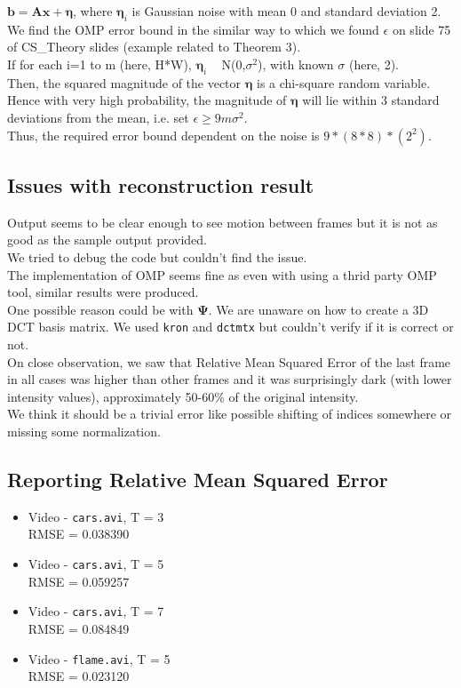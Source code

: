 \documentclass[fleqn, 11pt]{article}
\begin{document}
$\boldsymbol{b} = \boldsymbol{A} \boldsymbol{x} + \boldsymbol{\eta}$, where $\boldsymbol{\eta}_i$ is Gaussian noise with mean 0 and standard deviation 2. \\
We find the OMP error bound in the similar way to which we found $\epsilon$ on slide 75 of CS\_Theory slides (example related to Theorem 3). \\
If for each i=1 to m (here, H*W), $\boldsymbol{\eta}_i$ ~ N(0,$\sigma^2$), with known $\sigma$ (here, 2). \\
Then, the squared magnitude of the vector $\boldsymbol{\eta}$ is a chi-square random variable. \\
Hence with very high probability, the magnitude of $\boldsymbol{\eta}$ will lie within 3 standard deviations from the mean, i.e. set $\epsilon \ge 9m\sigma^2$. \\
Thus, the required error bound dependent on the noise is $9*(8*8)*(2^2)$.

\subsection*{Issues with reconstruction result}
Output seems to be clear enough to see motion between frames but it is not as good as the sample output provided. \\
We tried to debug the code but couldn't find the issue. \\
The implementation of OMP seems fine as even with using a thrid party OMP tool, similar results were produced. \\
One possible reason could be with $\boldsymbol{\Psi}$. We are unaware on how to create a 3D DCT basis matrix. We used \texttt{kron} and \texttt{dctmtx} but couldn't verify if it is correct or not. \\
On close observation, we saw that Relative Mean Squared Error of the last frame in all cases was higher than other frames and it was surprisingly dark (with lower intensity values), approximately 50-60\% of the original intensity. \\
We think it should be a trivial error like possible shifting of indices somewhere or missing some normalization. \\

\subsection*{Reporting Relative Mean Squared Error}
\begin{itemize}
    \item Video - \texttt{cars.avi}, T = 3 \\
    RMSE = 0.038390
    \item Video - \texttt{cars.avi}, T = 5 \\
    RMSE = 0.059257
    \item Video - \texttt{cars.avi}, T = 7 \\
    RMSE = 0.084849
    \item Video - \texttt{flame.avi}, T = 5 \\
    RMSE = 0.023120
\end{itemize}
\end{document}
